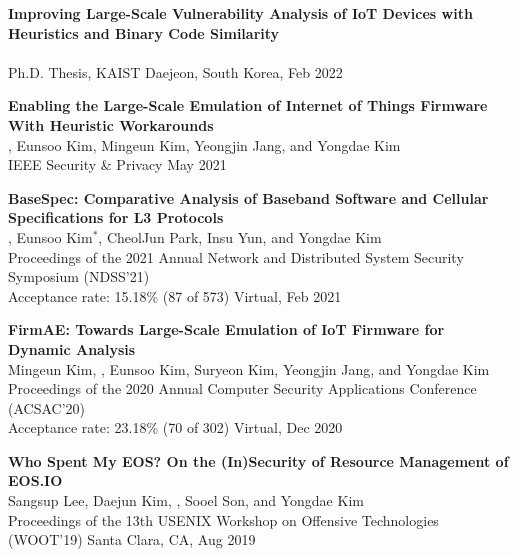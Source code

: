 \begin{enumerate}[label={[\arabic*]}, leftmargin=1.5em]
    \item \textbf{Improving Large-Scale Vulnerability Analysis of IoT Devices with
    Heuristics and Binary Code Similarity} \\
        {\small
             \\
            Ph.D. Thesis, KAIST
        }
    \hfill {\small Daejeon, South Korea, Feb 2022}


    \item \textbf{Enabling the Large-Scale Emulation of Internet of Things
        Firmware With Heuristic Workarounds} \\
        {\small
            , Eunsoo Kim, Mingeun Kim, Yeongjin Jang, and Yongdae Kim \\
            IEEE Security \& Privacy
        }
        \hfill {\small May 2021}

    \item \textbf{BaseSpec: Comparative Analysis of Baseband Software and Cellular Specifications for L3 Protocols} \\
        {\small
            , Eunsoo Kim$^\ast$, CheolJun Park, Insu Yun, and Yongdae Kim \\
            Proceedings of the 2021 Annual Network and Distributed System Security Symposium (NDSS'21) \\
            Acceptance rate: 15.18\% (87 of 573)
        }
        \hfill {\small Virtual, Feb 2021}

    \item \textbf{FirmAE: Towards Large-Scale Emulation of IoT Firmware for Dynamic Analysis} \\
        {\small
            Mingeun Kim, , Eunsoo Kim, Suryeon Kim, Yeongjin Jang, and Yongdae Kim \\
            Proceedings of the 2020 Annual Computer Security Applications Conference (ACSAC'20)\\
            Acceptance rate: 23.18\% (70 of 302)
        }
        \hfill {\small Virtual, Dec 2020}

    \item \textbf{Who Spent My EOS? On the (In)Security of Resource Management of EOS.IO} \\
        {\small
            Sangsup Lee, Daejun Kim, , Sooel Son, and Yongdae Kim \\
            Proceedings of the 13th USENIX Workshop on Offensive Technologies \\ (WOOT'19)
        } 
        \hfill {\small Santa Clara, CA, Aug 2019}


\end{enumerate}
